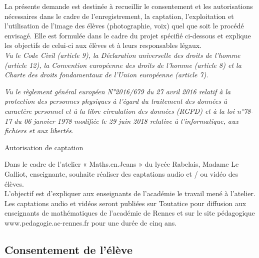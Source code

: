 \documentclass[10pt, a4paper,article]{nsi}
\begin{document}

\scriptsize
La présente demande est destinée à recueillir le consentement et les autorisations nécessaires dans le cadre de l'enregistrement, la captation, l'exploitation et l'utilisation de l'image des élèves (photographie, voix) quel que soit le procédé envisagé. Elle est formulée dans le cadre du projet spécifié ci-dessous et explique les objectifs de celui-ci aux élèves et à leurs responsables légaux.\\

\textit{Vu le Code Civil (article 9), la Déclaration universelle des droits de l'homme (article 12), la Convention européenne des droits de l'homme (article 8) et la Charte des droits fondamentaux de l'Union européenne (article 7).}

\textit{Vu le règlement général européen N°2016/679 du 27 avril 2016 relatif à la protection des personnes physiques à l'égard du traitement des données à caractère personnel et à la libre circulation des données (RGPD) et à la loi n°78-17 du 06 janvier 1978 modifiée le 29 juin 2018 relative à l'informatique, aux fichiers et aux libertés.}\\

\normalsize

\begin{center}
    \Large\color{UGLiBlue}\titlefont Autorisation de captation
\end{center}

Dans le cadre de l'atelier « Maths.en.Jeans » du lycée Rabelais, Madame Le Galliot, enseignante, souhaite réaliser des captations audio et / ou vidéo des élèves. \\
L'objectif est d'expliquer aux enseignants de l'académie le travail mené à l'atelier.\\


Les captations audio et vidéos seront publiées sur Toutatice pour diffusion aux enseignants de mathématiques de l'académie de Rennes et sur le site pédagogique www.pedagogie.ac-rennes.fr pour une durée de cinq ans.\\
\subsection*{Consentement de l'élève}
\end{document}
